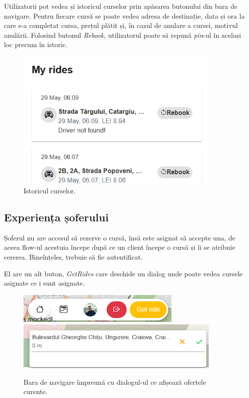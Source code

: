 Utilizatorii pot vedea și istoricul curselor prin apăsarea butonului din bara de navigare.
Pentru fiecare cursă se poate vedea adresa de destinație, data și ora la care s-a completat cursa, prețul plătit
și, în cazul de anulare a cursei, motivul anulării. Folosind butonul \textit{Rebook}, utilizatorul poate
să repună \textit{pin}-ul în același loc precum în istoric.

\begin{figure}[H]
    \centering
    \includegraphics[width=10cm]{Assets/history.png}
    \caption{Istoricul curselor.}
    \label{fig:historyRides}
\end{figure}

\subsection{Experiența șoferului}

Șoferul nu are accesul să rezerve o cursă, însă este asignat să accepte una, de aceea flow-ul acestuia începe după 
ce un client începe o cursă și îi se atribuie cererea. Bineînțeles, trebuie să fie autentificat.

El are un alt buton, \textit{GetRides} care deschide un dialog unde poate vedea cursele asignate ce i sunt asignate.

\begin{figure}[H]
    \centering
    \includegraphics[width=8cm]{Assets/driverNavBar.png}
    \includegraphics[width=10cm]{Assets/acceptRide.png}
    \caption{Bara de navigare împreună cu dialogul-ul ce afișează ofertele curente.}
    \label{fig:driverNavBar}
\end{figure}

